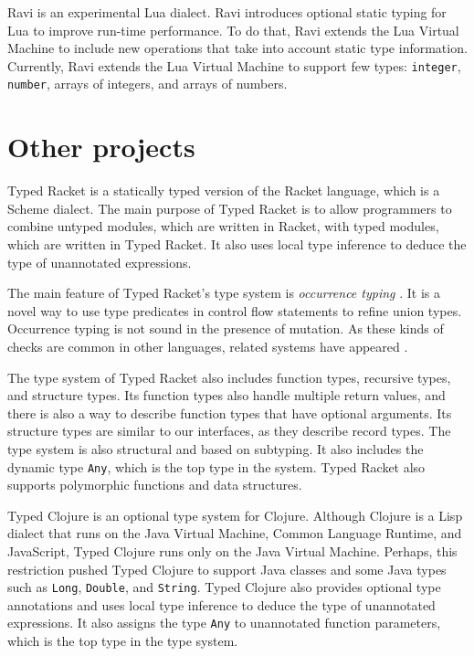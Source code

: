 Ravi \citep{ravi} is an experimental Lua dialect.
Ravi introduces optional static typing for Lua to improve run-time performance.
To do that, Ravi extends the Lua Virtual Machine to include new
operations that take into account static type information.
Currently, Ravi extends the Lua Virtual Machine to support few types:
\texttt{integer}, \texttt{number}, arrays of integers, and arrays of numbers.

\section{Other projects}

Typed Racket \citep{tobin-hochstadt2008ts} is a statically typed version
of the Racket language, which is a Scheme dialect.
The main purpose of Typed Racket is to allow programmers to combine
untyped modules, which are written in Racket, with typed modules, which are
written in Typed Racket.
It also uses local type inference to deduce the type of unannotated expressions.

The main feature of Typed Racket's type system is \emph{occurrence typing}
\citep{tobin-hochstadt2010ltu}.
It is a novel way to use type predicates in control flow statements
to refine union types.
Occurrence typing is not sound in the presence of mutation.
As these kinds of checks are common in other languages, related systems
have appeared \citep{guha2011tlc,winther2011gtp,pearce2013ccf}.

The type system of Typed Racket also includes function types, recursive
types, and structure types.
Its function types also handle multiple return values, and there is
also a way to describe function types that have optional arguments.
Its structure types are similar to our interfaces, as they describe record types.
The type system is also structural and based on subtyping.
It also includes the dynamic type \texttt{Any}, which is the top type in the system.
Typed Racket also supports polymorphic functions and data structures.

Typed Clojure \citep{bonnaire-sergeant2012typed-clojure} is an
optional type system for Clojure.
Although Clojure is a Lisp dialect that runs on the Java Virtual Machine,
Common Language Runtime, and JavaScript, Typed Clojure runs only on
the Java Virtual Machine.
Perhaps, this restriction pushed Typed Clojure to support Java classes
and some Java types such as \texttt{Long}, \texttt{Double}, and \texttt{String}.
Typed Clojure also provides optional type annotations and uses
local type inference to deduce the type of unannotated expressions.
It also assigns the type \texttt{Any} to unannotated function parameters,
which is the top type in the type system.

